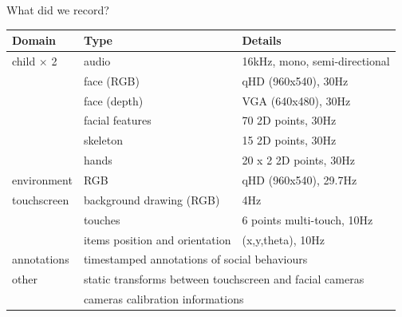 \documentclass[compress]{beamer}
\begin{document}

\begin{frame}{What did we record?}

\small
\begin{tabular}{@{}lll@{}}
\toprule
\textbf{Domain} & \textbf{Type}                              & \textbf{Details}                          \\ \midrule
child $\times$ 2        & audio                                      & 16kHz, mono, semi-directional             \\
                & face (RGB)                                 & qHD (960x540), 30Hz                       \\
                & face (depth)                               & VGA (640x480), 30Hz                       \\
                & facial features                            & 70 2D points, 30Hz                        \\
                & skeleton                                   & 15 2D points, 30Hz                        \\
                & hands                                      & 20 x 2 2D points, 30Hz                    \\ \midrule
environment     & RGB                                        & qHD (960x540), 29.7Hz                     \\ \midrule
touchscreen     & background drawing (RGB)                   & 4Hz                                       \\
                & touches                                    & 6 points multi-touch, 10Hz                \\
                & items position and orientation             & (x,y,theta), 10Hz                         \\ \midrule
annotations     & \multicolumn{2}{l}{timestamped annotations of social behaviours} \\\midrule
other           & \multicolumn{2}{l}{static transforms between touchscreen and facial cameras}           \\
                & \multicolumn{2}{l}{cameras calibration informations}                                   \\ \bottomrule
\end{tabular}

\end{frame}
\end{document}
